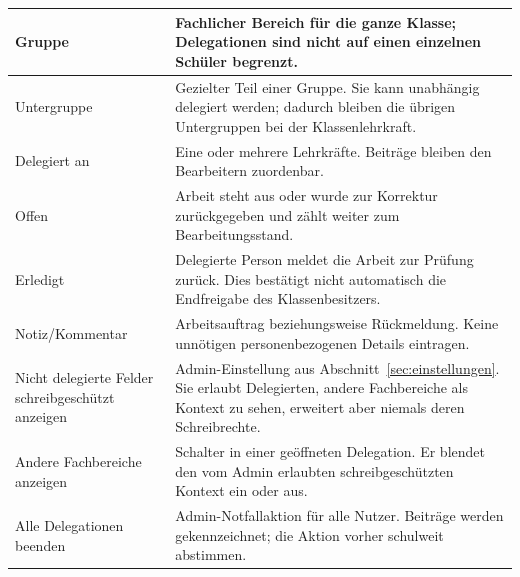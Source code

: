 \documentclass[12pt,a4paper]{article}
\begin{document}
\begin{tabularx}{\textwidth}{|p{}|X|}
\hline
Gruppe & Fachlicher Bereich für die ganze Klasse; Delegationen sind nicht auf einen einzelnen Schüler begrenzt.\\
\hline
Untergruppe & Gezielter Teil einer Gruppe. Sie kann unabhängig delegiert werden; dadurch bleiben die übrigen Untergruppen bei der Klassenlehrkraft.\\
\hline
Delegiert an & Eine oder mehrere Lehrkräfte. Beiträge bleiben den Bearbeitern zuordenbar.\\
\hline
Offen & Arbeit steht aus oder wurde zur Korrektur zurückgegeben und zählt weiter zum Bearbeitungsstand.\\
\hline
Erledigt & Delegierte Person meldet die Arbeit zur Prüfung zurück. Dies bestätigt nicht automatisch die Endfreigabe des Klassenbesitzers.\\
\hline
Notiz/Kommentar & Arbeitsauftrag beziehungsweise Rückmeldung. Keine unnötigen personenbezogenen Details eintragen.\\
\hline
Nicht delegierte Felder schreibgeschützt anzeigen & Admin-Einstellung aus Abschnitt~\ref{sec:einstellungen}. Sie erlaubt Delegierten, andere Fachbereiche als Kontext zu sehen, erweitert aber niemals deren Schreibrechte.\\
\hline
Andere Fachbereiche anzeigen & Schalter in einer geöffneten Delegation. Er blendet den vom Admin erlaubten schreibgeschützten Kontext ein oder aus.\\
\hline
Alle Delegationen beenden & Admin-Notfallaktion für alle Nutzer. Beiträge werden gekennzeichnet; die Aktion vorher schulweit abstimmen.\\
\hline
\end{tabularx}
\end{document}
